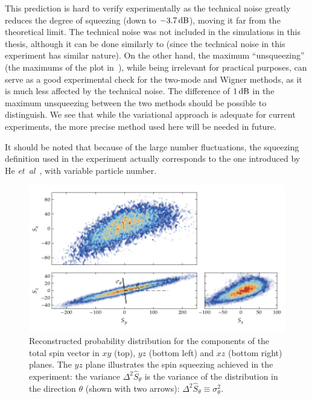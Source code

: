 This prediction is hard to verify experimentally as the technical noise greatly reduces the degree of squeezing (down to $-3.7\mbox{\ensuremath{\,\mathrm{dB}}}$), moving it far from the theoretical limit.
The technical noise was not included in the simulations in this thesis, although it can be done similarly to  (since the technical noise in this experiment has similar nature).
On the other hand, the maximum ``unsqueezing'' (the maximums of the plot in~), while being irrelevant for practical purposes, can serve as a good experimental check for the two-mode and Wigner methods, as it is much less affected by the technical noise.
The difference of $1\mbox{\ensuremath{\,\mathrm{dB}}}$ in the maximum unsqueezing between the two methods should be possible to distinguish.
We see that while the variational approach is adequate for current experiments, the more precise method used here will be needed in future.

It should be noted that because of the large number fluctuations, the squeezing definition used in the experiment actually corresponds to the one introduced by He \textit{et~al}~\cite{He2012-entanglement}, with variable particle number.

\begin{figure}
    \centerline{\includegraphics{figures_generated/bec_squeezing/riedel_cloud.pdf}}

    \caption[Orthogonal projections of total spin uncertainty cloud]{
    Reconstructed probability distribution for the components of the total spin vector in $xy$ (top), $yz$ (bottom left) and $xz$ (bottom right) planes.
    The $yz$ plane illustrates the spin squeezing achieved in the experiment: the variance $\Delta^2 \hat{S}_\theta$ is the variance of the distribution in the direction $\theta$ (shown with two arrows): $\Delta^2 \hat{S}_\theta \equiv \sigma_\theta^2$.}%
    \label{fig:bec-squeezing:separation:cloud}
\end{figure}

